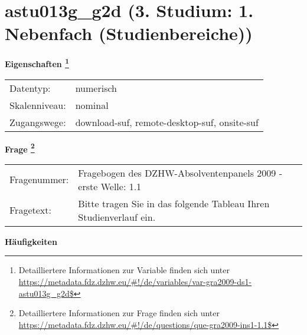 
    \setcounter{footnote}{0}

    \vspace*{-1.8cm}
	\section{astu013g\_g2d (3. Studium: 1. Nebenfach (Studienbereiche))}
	\label{section:astu013g_g2d}



    \vspace*{0.5cm}
    \noindent\textbf{Eigenschaften
	\footnote{Detailliertere Informationen zur Variable finden sich unter
		\url{https://metadata.fdz.dzhw.eu/\#!/de/variables/var-gra2009-ds1-astu013g_g2d$}}}\\
	\begin{tabularx}{\hsize}{@{}lX}
	Datentyp: & numerisch \\
	Skalenniveau: & nominal \\
	Zugangswege: &
	  download-suf, 
	  remote-desktop-suf, 
	  onsite-suf
 \\
    \end{tabularx}



				\vspace*{0.5cm}
                \noindent\textbf{Frage
	                \footnote{Detailliertere Informationen zur Frage finden sich unter
		              \url{https://metadata.fdz.dzhw.eu/\#!/de/questions/que-gra2009-ins1-1.1$}}}\\
				\begin{tabularx}{\hsize}{@{}lX}
					Fragenummer: &
					  Fragebogen des DZHW-Absolventenpanels 2009 - erste Welle:
					  1.1
 \\
					Fragetext: & Bitte tragen Sie in das folgende Tableau Ihren Studienverlauf ein. \\
				\end{tabularx}





        		\vspace*{0.5cm}
                \noindent\textbf{Häufigkeiten}

